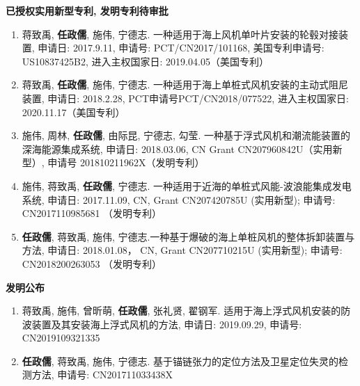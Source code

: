 \documentclass[10pt]{ctexart}
\begin{document}
{    \vspace{-0.8em}
    \textbf{已授权实用新型专利, 发明专利待审批}\vspace{-1.00em}
    \begin{enumerate}
    \item 蒋致禹, \textbf{任政儒}, 施伟, 宁德志. 一种适用于海上风机单叶片安装的轮毂对接装置, 申请日: 2017.9.11, 申请号: PCT/CN2017/101168, 美国专利申请号: US10837425B2, 进入主权国家日: 2019.04.05（美国专利）
    \item 蒋致禹, \textbf{任政儒}, 施伟, 宁德志. 一种适用于海上单桩式风机安装的主动式阻尼装置, 申请日: 2018.2.28, PCT申请号PCT/CN2018/077522, 进入主权国家日: 2020.11.17（美国专利）
    \item 施伟, 周林, \textbf{任政儒}, 由际昆, 宁德志, 勾莹. 一种基于浮式风机和潮流能装置的深海能源集成系统, 申请日: 2018.03.06, CN Grant CN207960842U（实用新型）, 申请号 201810211962X（发明专利） 
    \item 施伟, 蒋致禹, \textbf{任政儒}, 宁德志. 一种适用于近海的单桩式风能-波浪能集成发电系统, 申请日: 2017.11.09, CN, Grant CN207420785U (实用新型); 申请号: CN2017110985681 （发明专利）
    \item \textbf{任政儒}, 蒋致禹, 施伟, 宁德志.一种基于爆破的海上单桩风机的整体拆卸装置与方法, 申请日: 2018.01.08， CN, Grant CN207710215U (实用新型); 申请号: CN2018200263053 （发明专利）
    \end{enumerate}
    \vspace*{0.1em}
    
    \vspace{-0.8em}
    \textbf{发明公布}\vspace{-1.00em}
    \begin{enumerate}
    \item 蒋致禹, 施伟, 曾昕萌, \textbf{任政儒}, 张礼贤, 翟钢军. 适用于海上浮式风机安装的防波装置及其安装海上浮式风机的方法, 申请日: 2019.09.29, 申请号: CN2019109321335 
    \item \textbf{任政儒}, 蒋致禹, 施伟, 宁德志. 基于锚链张力的定位方法及卫星定位失灵的检测方法, 申请号: CN201711033438X
    \end{enumerate}
    \vspace*{0.1em}
}\fi

\vspace{-2em}
\end{document}
